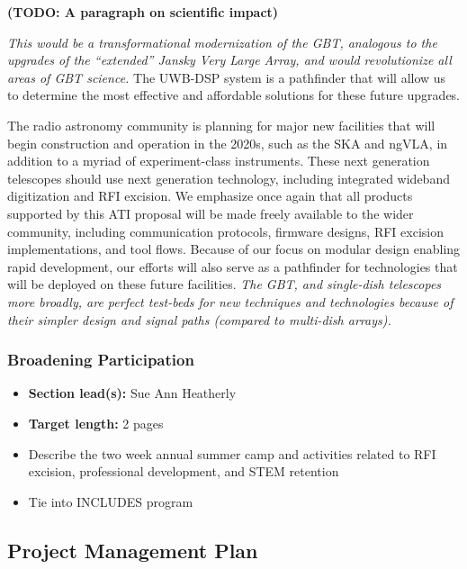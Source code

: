 \documentclass[10pt]{myNSF}
\begin{document}
\textbf{(TODO: A paragraph on scientific impact)}

\emph{This would be a transformational modernization of
  the GBT, analogous to the upgrades of the ``extended'' Jansky Very
  Large Array, and would revolutionize all areas of GBT science.}  The
UWB-DSP system is a pathfinder that will allow us to determine the
most effective and affordable solutions for these future upgrades.


The radio astronomy community is planning for major new facilities
that will begin construction and operation in the 2020s, such as the
SKA and ngVLA, in addition to a myriad of experiment-class
instruments.  These next generation telescopes should use next
generation technology, including integrated wideband digitization and
RFI excision.  We emphasize once again that all products supported by
this ATI proposal will be made freely available to the wider
community, including communication protocols, firmware designs, RFI
excision implementations, and tool flows.  Because of our focus on
modular design enabling rapid development, our efforts will also serve
as a pathfinder for technologies that will be deployed on these future
facilities.  \emph{The GBT, and single-dish telescopes more broadly,
  are perfect test-beds for new techniques and technologies because of
  their simpler design and signal paths (compared to multi-dish
  arrays).}

\subsubsection{Broadening Participation}
\label{sec:participation}

\begin{itemize}
\item{\textbf{Section lead(s):} Sue Ann Heatherly}
\item{\textbf{Target length:} 2 pages}
\item{Describe the two week annual summer camp and activities related
  to RFI excision, professional development, and STEM retention}
\item{Tie into INCLUDES program}
\end{itemize}

\subsection{Project Management Plan}
\label{sec:plan}
\end{document}
